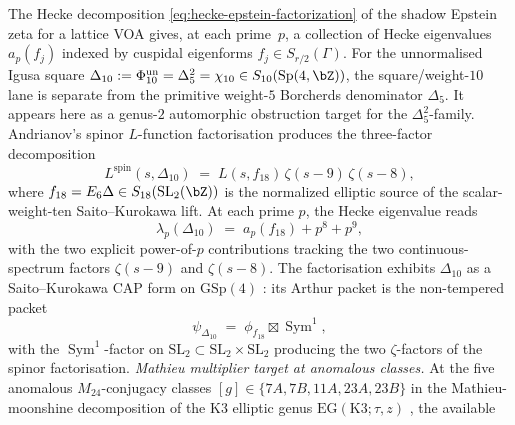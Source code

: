 \begin{remark}
\label{rem:arith-shad-9}%
%
%
%
%
The Hecke decomposition
\eqref{eq:hecke-epstein-factorization} of the shadow Epstein zeta for
a lattice VOA gives, at each prime~$p$, a collection of Hecke
eigenvalues $a_p(f_j)$ indexed by cuspidal eigenforms $f_j \in
S_{r/2}(\Gamma)$. For the unnormalised Igusa square
$\Delta_{10}:=\Phi_{10}^{\mathrm{un}}=\Delta_5^2=\chi_{10}
\in S_{10}(\mathrm{Sp}(4, \bZ))$, the square/weight-$10$ lane is
separate from the primitive weight-$5$ Borcherds denominator
$\Delta_5$. It appears here as a genus-$2$ automorphic obstruction
target for the $\Delta_5^2$-family. Andrianov's spinor
$L$-function factorisation \cite{Andrianov1974} produces the
three-factor decomposition
\begin{equation}\label{eq:andrianov-delta10-factorisation}
 L^{\mathrm{spin}}(s, \Delta_{10})
 \;=\;
 L(s, f_{18})\,\zeta(s-9)\,\zeta(s-8),
\end{equation}
where $f_{18}=E_6\Delta\in S_{18}(\mathrm{SL}_2(\bZ))$ is the
normalized elliptic source of the scalar-weight-ten
Saito--Kurokawa lift. At each
prime $p$, the Hecke eigenvalue reads
\begin{equation}\label{eq:andrianov-hecke-lambda}
 \lambda_p(\Delta_{10})
 \;=\;
 a_p(f_{18}) + p^8 + p^9,
\end{equation}
with the two explicit power-of-$p$ contributions tracking the two
continuous-spectrum factors $\zeta(s-9)$ and $\zeta(s-8)$.
The factorisation exhibits $\Delta_{10}$ as a Saito--Kurokawa CAP
form on $\mathrm{GSp}(4)$ \cite{PiatetskiShapiro1983,Schmidt2007}:
its Arthur packet is the non-tempered packet
\begin{equation}\label{eq:arthur-packet-delta10}
 \psi_{\Delta_{10}}
 \;=\;
 \phi_{f_{18}} \boxtimes \operatorname{Sym}^1,
\end{equation}
with the $\operatorname{Sym}^1$-factor on $\mathrm{SL}_2 \subset
\mathrm{SL}_2 \times \mathrm{SL}_2$ producing the two $\zeta$-factors
of the spinor factorisation.
\emph{Mathieu multiplier target at anomalous classes.} At the five
anomalous $M_{24}$-conjugacy classes
$[g]\in\{7A,7B,11A,23A,23B\}$ in the Mathieu-moonshine
decomposition of the K3 elliptic genus
$\mathrm{EG}(\mathrm{K3};\tau,z)$
\cite{EguchiOoguriTachikawa2011,Gaberdiel2010}, the available

\end{remark}

